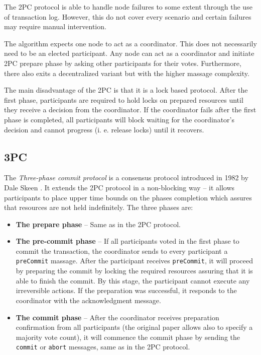 \documentclass[oneside,
  digital, %
  table,   %
  lof,     %
  lot,     %
]{fithesis3}
\begin{document}
The 2PC protocol is able to handle node failures to some extent through the use of transaction log. However, this do not cover every scenario and certain failures may require manual intervention.

The algorithm expects one node to act as a coordinator. This does not necessarily need to be an elected participant. Any node can act as a coordinator and initiate 2PC prepare phase by asking other participants for their votes. Furthermore, there also exits a decentralized variant but with the higher massage complexity.

The main disadvantage of the 2PC is that it is a lock based protocol. After the first phase, participants are required to hold locks on prepared resources until they receive a decision from the coordinator. If the coordinator fails after the first phase is completed, all participants will block waiting for the coordinator's decision and cannot progress (i. e. release locks) until it recovers.

\subsection{3PC}

The \textit{Three-phase commit protocol} is a consensus protocol introduced in 1982 by Dale Skeen \cite{3PC}. It extends the 2PC protocol in a non-blocking way -- it allows participants to place upper time bounds on the phases completion which assures that resources are not  held indefinitely. The three phases are:

\begin{itemize}
    \item \textbf{The prepare phase} -- Same as in the 2PC protocol.
    
    \item \textbf{The pre-commit phase} -- If all participants voted in the first phase to commit the transaction, the coordinator sends to every participant a \texttt{preCommit} massage. After the participant receives \texttt{preCommit}, it will proceed by preparing the commit by locking the required resources assuring that it is able to finish the commit. By this stage, the participant cannot execute any irreversible actions. If the preparation was successful, it responds to the coordinator with the acknowledgment message.
    
    \item \textbf{The commit phase} -- After the coordinator receives preparation confirmation from all participants (the original paper \cite{3PC} allows also to specify a majority vote count), it will commence the commit phase by sending the \texttt{commit} or \texttt{abort} messages, same as in the 2PC protocol.
\end{itemize}
\end{document}
